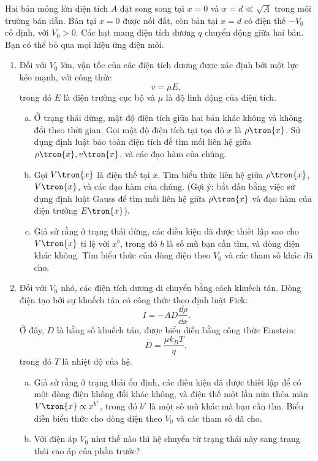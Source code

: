 \begin{vd}
Hai bản mỏng lớn diện tích $A$ đặt song song tại $x=0$ và $x=d\ll \sqrt{A}$ trong môi trường bán dẫn. Bản tại $x=0$ được nối đất, còn bản tại $x=d$ có điện thế $-V_0$ cố định, với $V_0>0$. Các hạt mang điện tích dương $q$ chuyển động giữa hai bản. Bạn có thể bỏ qua mọi hiệu ứng điện môi.
\begin{enumerate}[1)]
    \item Đối với $V_0$ lớn, vận tốc của các điện tích dương được xác định bởi một lực kéo mạnh, với công thức
    $$v=\mu E,$$
    trong đó $E$ là điện trường cục bộ và $\mu$ là độ linh động của điện tích. 
    \begin{enumerate}[a)]
        \item Ở trạng thái dừng, mật độ điện tích giữa hai bản khác không và không đổi theo thời gian. Gọi mật độ điện tích tại tọa độ $x$ là $\rho\tron{x}$. Sử dụng định luật bảo toàn điện tích để tìm mối liên hệ giữa $\rho\tron{x},v\tron{x}$, và các đạo hàm của chúng.
        \item Gọi $V\tron{x}$ là điện thế tại $x$. Tìm biểu thức liên hệ giữa $\rho\tron{x}$,$V\tron{x}$, và các đạo hàm của chúng. (Gợi ý: bắt đầu bằng việc sử dụng định luật Gauss để tìm mối liên hệ giữa $\rho\tron{x}$ và đạo hàm của điện trường $E\tron{x}$).
        \item Giả sử rằng ở trạng thái dừng, các điều kiện đã được thiết lập sao cho $V\tron{x}$ tỉ lệ với $x^b$, trong đó $b$ là số mũ bạn cần tìm, và dòng điện khác không. Tìm biểu thức của dòng điện theo $V_0$ và các tham số khác đã cho.
    \end{enumerate}
\item Đối với $V_0$ nhỏ, các điện tích dương di chuyển bằng cách khuếch tán. Dòng điện tạo bởi sự khuếch tán có công thức theo định luật Fick:
$$I = -AD\dfrac{\dd \rho}{\dd x}.$$
Ở đây, $D$ là hằng số khuếch tán, được biểu diễn bằng công thức Einstein:
$$D = \dfrac{\mu k_B T}{q},$$
trong đó $T$ là nhiệt độ của hệ.
\begin{enumerate}[a)]
    \item Giả sử rằng ở trạng thái ổn định, các điều kiện đã được thiết lập để có một dòng điện không đổi khác không, và điện thế một lần nữa thỏa mãn $V\tron{x}\propto x^{b'}$, trong đó $b'$ là một số mũ khác mà bạn cần tìm. Biểu diễn biểu thức cho dòng điện theo $V_0$ và các tham số đã cho.
    \item Với điện áp $V_0$ như thế nào thì hệ chuyển từ trạng thái này sang trạng thái cao áp của phần trước?
    
\end{enumerate}
\end{enumerate}
\end{vd}
